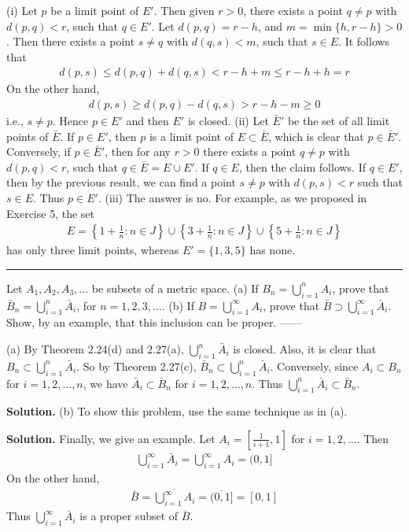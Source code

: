 \documentclass[12pt]{article}
\theoremstyle{definition}
\begin{document}
(i) Let $p$ be a limit point of $E'$. Then given $r>0$, there exists a point $q\ne p$ with $d(p,q)<r$, such that $q\in E'$. Let $d(p,q)=r-h$, and $m=\min\{h,r-h\}>0$. Then there exists a point $s\ne q$ with $d(q,s)<m$, such that $s\in E$. It follows that
\begin{align*}
d(p,s)
\le d(p,q)+d(q,s)
<r-h+m
\le r-h+h
=r
\end{align*}
On the other hand,
\begin{align*}
d(p,s)
\ge d(p,q)-d(q,s)
> r-h-m
\ge 0
\end{align*}
i.e., $s\ne p$. Hence $p\in E'$ and then $E'$ is closed.
(ii) Let $\bar{E}'$ be the set of all limit points of $\bar{E}$. If $p\in E'$, then $p$ is a limit point of $E\subset\bar{E}$, which is clear that $p\in\bar{E}'$. Conversely, if $p\in\bar{E}'$, then for any $r>0$ there exists a point $q\ne p$ with $d(p,q)<r$, such that $q\in\bar{E}=E\cup E'$. If $q\in E$, then the claim follows. If $q\in E'$, then by the previous result, we can find a point $s\ne p$ with $d(p,s)<r$ such that $s\in E$. Thus $p\in E'$.
(iii) The answer is no. For example, as we proposed in Exercise 5, the set
\begin{align*}
E=\left\{1+\frac{1}{n}:n\in J\right\}\cup\left\{3+\frac{1}{n}:n\in J\right\}\cup\left\{5+\frac{1}{n}:n\in J\right\}
\end{align*}
has only three limit points, whereas $E'=\{1,3,5\}$ has none.



\bigskip\noindent\hrule\bigskip

Let $A_1,A_2,A_3,\ldots$ be subsets of a metric space.
(a) If $B_n=\bigcup_{i=1}^nA_i$, prove that $\bar{B}_n=\bigcup_{i=1}^n\bar{A}_i$, for $n=1,2,3,\ldots$.
(b) If $B=\bigcup_{i=1}^\infty A_i$, prove that $\bar{B}\supset\bigcup_{i=1}^\infty\bar{A}_i$.
Show, by an example, that this inclusion can be proper.
------

(a) By Theorem 2.24(d) and 2.27(a), $\bigcup_{i=1}^n\bar{A}_i$ is closed. Also, it is clear that $B_n\subset\bigcup_{i=1}^n\bar{A}_i$. So by Theorem 2.27(c), $\bar{B}_n\subset\bigcup_{i=1}^n\bar{A}_i$. Conversely, since $A_i\subset B_n$ for $i=1,2,\ldots,n$, we have $\bar{A}_i\subset\bar{B}_n$ for $i=1,2,\ldots,n$. Thus $\bigcup_{i=1}^n\bar{A}_i\subset\bar{B}_n$.

\smallskip
\noindent\textbf{Solution.}\quad
(b) To show this problem, use the same technique as in (a).

\smallskip
\noindent\textbf{Solution.}\quad
Finally, we give an example. Let $A_i=\left[\tfrac{1}{i+1},1\right]$ for $i=1,2,\ldots$. Then
\begin{align*}
\bigcup_{i=1}^\infty\bar{A}_i=\bigcup_{i=1}^\infty A_i=(0,1]
\end{align*}
On the other hand,
\begin{align*}
\bar{B}=\overline{\bigcup_{i=1}^\infty A_i}=\overline{(0,1]}=[0,1]
\end{align*}
Thus $\bigcup_{i=1}^\infty\bar{A}_i$ is a proper subset of $\bar{B}$.
\end{document}
